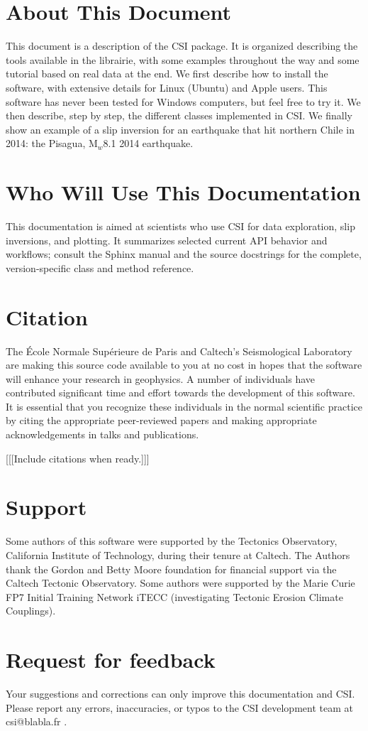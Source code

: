 \section{About This Document}
This document is a description of the CSI package. It is organized describing the tools available in the librairie, with some examples throughout the way and some tutorial based on real data at the end. We first describe how to install the software, with extensive details for Linux (Ubuntu) and Apple users. This software has never been tested for Windows computers, but feel free to try it. We then describe, step by step, the different classes implemented in CSI. We finally show an example of a slip inversion for an earthquake that hit northern Chile in 2014: the Pisagua, $\text{M}_w$8.1 2014 earthquake.

\section{Who Will Use This Documentation}
This documentation is aimed at scientists who use CSI for data exploration, slip inversions, and plotting. It summarizes selected current API behavior and workflows; consult the Sphinx manual and the source docstrings for the complete, version-specific class and method reference.

\section{Citation}
The \'Ecole Normale Sup\'erieure de Paris and Caltech's Seismological Laboratory are making this source code available to you at no cost in hopes that the software will enhance your research in geophysics. A number of individuals have contributed significant time and effort towards the development of this software. It is essential that you recognize these individuals in the normal scientific practice by citing the appropriate peer-reviewed papers and making appropriate acknowledgements in talks and publications. 

[[[Include citations when ready.]]]

\section{Support}
Some authors of this software were supported by the Tectonics Observatory, California Institute of Technology, during their tenure at Caltech. The Authors thank the Gordon and Betty Moore foundation for financial support via the Caltech Tectonic Observatory. Some authors were supported by the Marie Curie FP7 Initial Training Network iTECC (investigating Tectonic Erosion Climate Couplings).  

\section{Request for feedback}
Your suggestions and corrections can only improve this documentation and CSI. Please report any errors, inaccuracies, or typos to the CSI development team at csi@blabla.fr .
